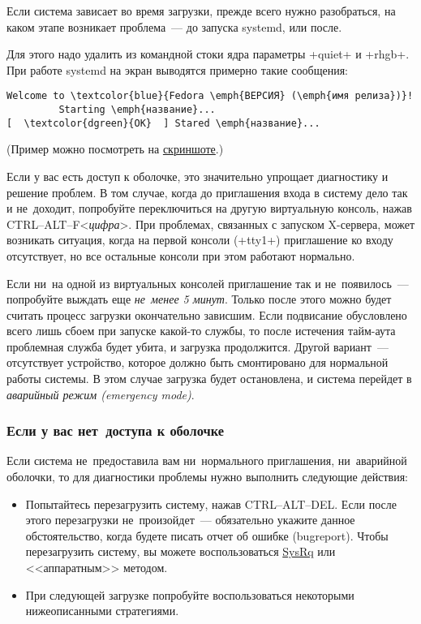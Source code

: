 \documentclass[10pt,oneside,a4paper]{article}
\begin{document}
Если система зависает во время загрузки, прежде всего нужно разобраться, на
каком этапе возникает проблема~--- до запуска systemd, или после.

Для этого надо удалить из командной стоки ядра параметры +quiet+ и +rhgb+. При
работе systemd на экран выводятся примерно такие сообщения:
\begin{Verbatim}[commandchars=\\\{\}]
Welcome to \textcolor{blue}{Fedora \emph{ВЕРСИЯ} (\emph{имя релиза})}!
         Starting \emph{название}...
[  \textcolor{dgreen}{OK}  ] Stared \emph{название}...
\end{Verbatim}
(Пример можно посмотреть на
\href{http://freedesktop.org/wiki/Software/systemd/Debugging?action=AttachFile&do=view&target=f17boot.png}{скриншоте}.)

Если у вас есть доступ к оболочке, это значительно упрощает диагностику и
решение проблем. В том случае, когда до приглашения входа в систему дело так и
не~доходит, попробуйте переключиться на другую виртуальную консоль, нажав
CTRL--ALT--F<\emph{цифра}>. При проблемах, связанных с запуском X-сервера, может
возникать ситуация, когда на первой консоли (+tty1+) приглашение ко входу
отсутствует, но все остальные консоли при этом работают нормально.

Если ни~на одной из виртуальных консолей приглашение так и не~появилось~---
попробуйте выждать еще \emph{не~менее 5 минут}. Только после этого можно
будет считать процесс загрузки окончательно зависшим. Если подвисание
обусловлено всего лишь сбоем при запуске какой-то службы, то после истечения
тайм-аута проблемная служба будет убита, и загрузка продолжится. Другой
вариант~--- отсутствует устройство, которое должно быть смонтировано для
нормальной работы системы. В этом случае загрузка будет остановлена, и система
перейдет в \emph{аварийный режим (emergency mode)}.

\subsubsection{Если у вас нет~доступа к оболочке}

Если система не~предоставила вам ни~нормального приглашения, ни~аварийной
оболочки, то для диагностики проблемы нужно выполнить следующие действия:
\begin{itemize}
	\item Попытайтесь перезагрузить систему, нажав CTRL--ALT--DEL. Если после
		этого перезагрузки не~произойдет~--- обязательно укажите данное
		обстоятельство, когда будете писать отчет об ошибке (bugreport).
		Чтобы перезагрузить систему, вы можете воспользоваться
		\href{http://fedoraproject.org/wiki/QA/Sysrq}{SysRq} или
		<<аппаратным>> методом.
	\item При следующей загрузке попробуйте воспользоваться некоторыми
		нижеописанными стратегиями.
\end{itemize}
\end{document}
